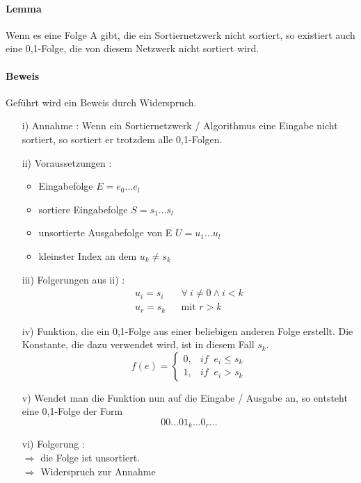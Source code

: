 \documentclass[11pt]{article}
\begin{document}
\paragraph{Lemma}
Wenn es eine Folge A gibt, die ein Sor\-tier\-netz\-werk nicht sortiert, so existiert auch eine 0,1-Folge, die von diesem Netzwerk nicht sortiert wird.
\paragraph{Beweis} Geführt wird ein Beweis durch Widerspruch. 
\begin{enumerate}
\item[i)] Annahme : Wenn ein Sortiernetzwerk / Algorithmus eine Eingabe nicht sortiert, so sortiert er trotzdem alle 0,1-Folgen.
\item[ii)] Voraussetzungen : \begin{itemize}
\item Eingabefolge $E = e_0 \dots e_l$
\item sortiere Eingabefolge $ S = s_1 \dots s_l$
\item unsortierte Ausgabefolge von E $ U = u_1 \dots u_l $
\item kleinster Index an dem $u_k \neq s_k$ 
\end{itemize}
\item[iii)] Folgerungen aus ii) :
\begin{eqnarray}
u_i = s_i & & \forall \ i \neq 0 \wedge i < k \\
u_r = s_k & & \text{mit } r > k
\end{eqnarray}
\item[iv)] Funktion, die ein 0,1-Folge aus einer beliebigen anderen Folge erstellt. Die Konstante, die dazu verwendet wird, ist in diesem Fall $s_k$.
\begin{equation}
f(e) = \begin{cases} 0 , & if \;\; e_i \leq s_k \\
    1 , & if \;\; e_i > s_k
    \end{cases}
\label{eq:cases}
\end{equation}
\item[v)] Wendet man die Funktion nun auf die Eingabe / Ausgabe an, so entsteht eine 0,1-Folge der Form 
\begin{equation}
00 \dots 01_k\dots0_r \dots
\label{eq:01folge}
\end{equation}
\item[vi)] Folgerung : \\
$\Rightarrow$ die Folge ist unsortiert.\\
$\Rightarrow$ Widerspruch zur Annahme
\end{enumerate}
\end{document}
